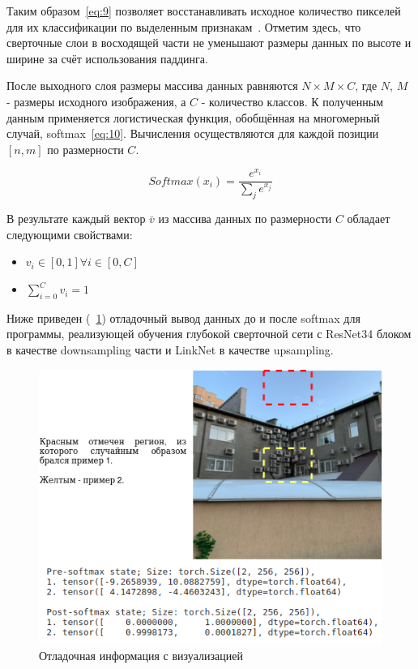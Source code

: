 Таким образом~\eqref{eq:9} позволяет восстанавливать исходное количество пикселей для их классификации по выделенным признакам~\autocite{dumoulin2016guide}.
Отметим здесь, что сверточные слои в восходящей части не уменьшают размеры данных по высоте и ширине за счёт использования паддинга.

После выходного слоя размеры массива данных равняются $ N \times M \times C $, где $N$, $M$ - размеры исходного изображения, а $C$ - количество классов.
К полученным данным применяется логистическая функция, обобщённая на многомерный случай, softmax~\eqref{eq:10}.
Вычисления осуществляются для каждой позиции $ [n, m] $ по размерности $C$\@.

\begin{equation}
    \label{eq:10}
    Softmax(x_{i}) = \frac{{}e^{x_{i}}}{\sum_{j}e^{x_{j}}}
\end{equation}

В результате каждый вектор $\bar{v}$ из массива данных по размерности $C$ обладает следующими свойствами:

\begin{itemize}
    \item $v_{i} \in [0,1] \forall i \in [0, C]$ \\
    \item $\sum_{i=0}^{C} v_{i}=1$
\end{itemize}

Ниже приведен (~\ref{fig:softmax_debug_info}) отладочный вывод данных до и после softmax для программы, реализующей обучения глубокой сверточной сети с ResNet34 блоком в качестве downsampling части
и LinkNet в качестве upsampling.

\begin{figure}[H]
    \centering
    \includegraphics[width=\textwidth]{img/softmax_debug_info.png}
    \caption{Отладочная информация с визуализацией}
    \label{fig:softmax_debug_info}
\end{figure}

